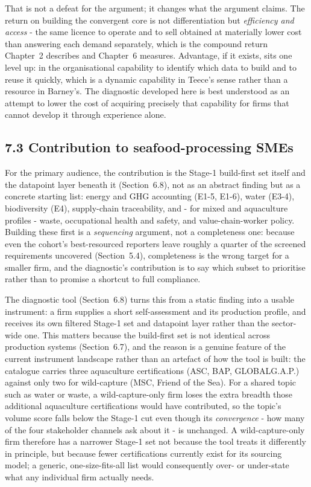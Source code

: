\documentclass[
]{article}
\begin{document}
That is not a defeat for the argument; it changes what the argument claims. The
return on building the convergent core is not differentiation but \emph{efficiency
and access} - the same licence to operate and to sell obtained at materially lower
cost than answering each demand separately, which is the compound return Chapter~2
describes and Chapter~6 measures. Advantage, if it exists, sits one level up: in
the organisational capability to identify which data to build and to reuse it
quickly, which is a dynamic capability in Teece's sense rather than a resource in
Barney's. The diagnostic developed here is best understood as an attempt to lower
the cost of acquiring precisely that capability for firms that cannot develop it
through experience alone.

\subsection{7.3 Contribution to seafood-processing
SMEs}\label{discussion-sme-contribution}

For the primary audience, the contribution is the Stage-1 build-first set
itself and the datapoint layer beneath it (Section~6.8), not as an abstract
finding but as a concrete starting list: energy and GHG accounting (E1-5,
E1-6), water (E3-4), biodiversity (E4), supply-chain traceability, and - for
mixed and aquaculture profiles - waste, occupational health and safety, and
value-chain-worker policy.
Building these first is a \emph{sequencing} argument, not a completeness one:
because even the cohort's best-resourced reporters leave roughly a quarter of
the screened requirements uncovered (Section~5.4), completeness is the wrong
target for a smaller firm, and the diagnostic's contribution is to say which
subset to prioritise rather than to promise a shortcut to full compliance.

The diagnostic tool (Section~6.8) turns this from a static finding into a
usable instrument: a firm supplies a short self-assessment and its production
profile, and receives its own filtered Stage-1 set and datapoint layer rather
than the sector-wide one. This matters because the build-first set is not
identical across production systems (Section~6.7), and the reason is a
genuine feature of the current instrument landscape rather than an artefact
of how the tool is built: the catalogue carries three aquaculture
certifications (ASC, BAP, GLOBALG.A.P.) against only two for wild-capture
(MSC, Friend of the Sea). For a shared topic such as water or waste, a
wild-capture-only firm loses the extra breadth those additional aquaculture
certifications would have contributed, so the topic's volume score falls
below the Stage-1 cut even though its \emph{convergence} - how many of the
four stakeholder channels ask about it - is unchanged. A wild-capture-only
firm therefore has a narrower Stage-1 set not because the tool treats it
differently in principle, but because fewer certifications currently exist
for its sourcing model; a generic, one-size-fits-all list would consequently
over- or under-state what any individual firm actually needs.
\end{document}
